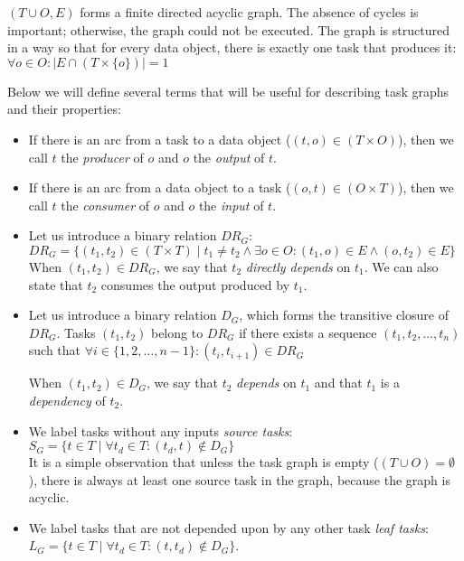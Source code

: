 $(T \cup O, E)$ forms a finite directed acyclic graph. The absence of cycles is important;
otherwise, the graph could not be executed. The graph is structured in a way so that for every data
object, there is exactly one task that produces it: \\ $\forall o \in O: |E \cap (T \times \{o\})| = 1$

\vspace{2mm}Below we will define several terms that will be useful for describing task
graphs and their properties:
\begin{itemize}
	\item If there is an arc from a task to a data object ($(t,o) \in (T\times{}O)$), then we call
	      $t$ the \emph{producer} of $o$ and
	      $o$ the \emph{output} of $t$.
	\item If there is an arc from a data object to a task ($(o,t) \in (O\times{}T)$), then we call
	      $t$ the \emph{consumer} of $o$ and
	      $o$ the \emph{input} of $t$.

	\item Let us introduce a binary relation $DR_G$: \\ $DR_G = \{(t_1, t_2)\in{}(T\times{}T) \mid t_1 \neq t_2 \land
		      \exists{}o\in{}O\colon (t_1, o)\in{}E
		      \land (o, t_2)\in{}E\}$ \\ When
	      $(t_1, t_2) \in DR_G$, we say that $t_2$ \emph{directly depends} on
	      $t_1$. We can also state that $t_2$ consumes the output produced
	      by $t_1$.

	\item Let us introduce a binary relation $D_G$, which forms the transitive closure of
	      $DR_G$. Tasks $(t_1, t_2)$ belong to $DR_G$ if there
	      exists a sequence $(t_1, t_2, \ldots, t_n)$ such that $\forall i \in \{1,2,\ldots,n - 1\}: (t_i, t_{i+1}) \in DR_G$

	      When $(t_1, t_2) \in D_G$, we say that $t_2$ \emph{depends} on
	      $t_1$ and that $t_1$ is a \emph{dependency} of
	      $t_2$.

	\item We label tasks without any inputs \emph{source tasks}: \\ $S_G = \{ t\in{}T \mid
		      \forall{}t_d\in{}T\colon (t_d, t)\notin D_G\}$ \\ It is a
	      simple observation that unless the task graph is empty ($(T\cup{}O) = \emptyset$), there is always at
	      least one source task in the graph, because the graph is acyclic.
	\item We label tasks that are not depended upon by any other task \emph{leaf tasks}: \\
	      $L_G = \{ t\in{}T \mid \forall{}t_d\in{}T: (t,
		      t_d)\notin D_G\}$.
\end{itemize}

